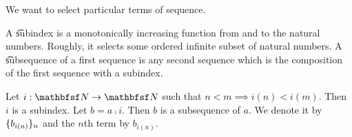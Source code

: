 
We want to select particular terms of sequence.

A \t{subindex} is a monotonically increasing function from and to the natural numbers.
Roughly, it selects some ordered infinite subset of natural numbers.
A \t{subsequence} of a first sequence is any second sequence which is the composition of the first sequence with a subindex.


Let $i: \N \to \N$ such that $n < m \implies i(n) < i(m)$.
Then $i$ is a subindex.
Let $b = a \comp i$.
Then $b$ is a subsequence of $a$.
We denote it by $\{b_{i(n)}\}_n$ and the $n$th term by $b_{i(n)}$.

\blankpage
